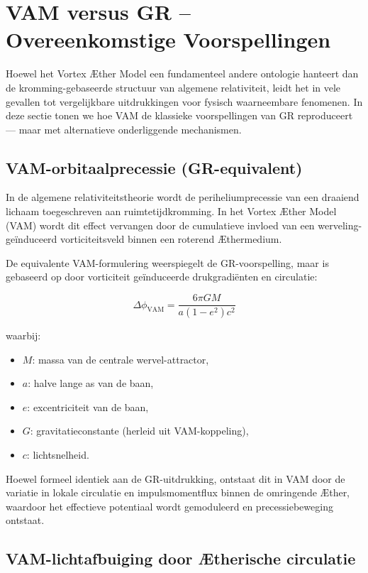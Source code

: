 \section{VAM versus GR – Overeenkomstige Voorspellingen}\label{sec:vam-versus-gr--overeenkomstige-voorspellingen}

Hoewel het Vortex Æther Model een fundamenteel andere ontologie hanteert dan de kromming-gebaseerde structuur van algemene relativiteit, leidt het in vele gevallen tot vergelijkbare uitdrukkingen voor fysisch waarneembare fenomenen. In deze sectie tonen we hoe VAM de klassieke voorspellingen van GR reproduceert — maar met alternatieve onderliggende mechanismen.


\subsection*{VAM-orbitaalprecessie (GR-equivalent)}


In de algemene relativiteitstheorie wordt de periheliumprecessie van een draaiend lichaam toegeschreven aan ruimtetijdkromming. In het Vortex Æther Model (VAM) wordt dit effect vervangen door de cumulatieve invloed van een werveling-geïnduceerd vorticiteitsveld binnen een roterend Æthermedium.

De equivalente VAM-formulering weerspiegelt de GR-voorspelling, maar is gebaseerd op door vorticiteit geïnduceerde drukgradiënten en circulatie:

\begin{equation}
    \Delta\phi_{\text{VAM}} =
    \frac{6\pi G M}{a(1 - e^2) c^2}
\end{equation}

waarbij:
\begin{itemize}
    \item \( M \): massa van de centrale wervel-attractor,
    \item \( a \): halve lange as van de baan,
    \item \( e \): excentriciteit van de baan,
    \item \( G \): gravitatieconstante (herleid uit VAM-koppeling),
    \item \( c \): lichtsnelheid.
\end{itemize}
Hoewel formeel identiek aan de GR-uitdrukking, ontstaat dit in VAM door de variatie in lokale circulatie en impulsmomentflux binnen de omringende Æther, waardoor het effectieve potentiaal wordt gemoduleerd en precessiebeweging ontstaat.

\subsection*{VAM-lichtafbuiging door Ætherische circulatie}



